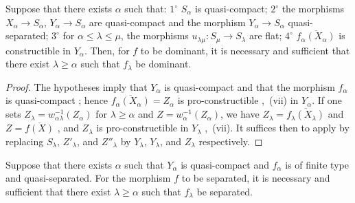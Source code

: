 \begin{proposition}[8.10.3]
\label{IV.8.10.3}
Suppose that there exists $\alpha$ such that: $1^\circ$ $S_\alpha$ is quasi-compact; $2^\circ$ the morphisms $X_\alpha\to S_\alpha$, $Y_\alpha\to S_\alpha$ are quasi-compact and the morphism $Y_\alpha\to S_\alpha$ quasi-separated; $3^\circ$ for $\alpha\leqslant\lambda\leqslant\mu$, the morphisms $u_{\lambda\mu}:S_\mu\to S_\lambda$ are flat; $4^\circ$ $\overline{f_\alpha(X_\alpha)}$ is constructible in $Y_\alpha$.
Then, for $f$ to be dominant, it is necessary and sufficient that there exist $\lambda\geqslant\alpha$ such that $f_\lambda$ be dominant.
\end{proposition}

\begin{proof}
The hypotheses imply that $Y_\alpha$ is quasi-compact and that the morphism $f_\alpha$ is quasi-compact ; hence $\overline{f_\alpha(X_\alpha)}=Z_\alpha$ is pro-constructible ,~(vii) in $Y_\alpha$.
If one sets $Z_\lambda=w_{\alpha\lambda}^{-1}(Z_\alpha)$ for $\lambda\geqslant\alpha$ and $Z=w_\alpha^{-1}(Z_\alpha)$, we have $Z_\lambda=\overline{f_\lambda(X_\lambda)}$ and $Z=\overline{f(X)}$ , and $Z_\lambda$ is pro-constructible in $Y_\lambda$ ,~(vii).
It suffices then to apply  by replacing $S_\lambda$, $Z'_\lambda$, and $Z''_\lambda$ by $Y_\lambda$, $Y_\lambda$, and $Z_\lambda$ respectively.
\end{proof}

\begin{proposition}[8.10.4]
\label{IV.8.10.4}
Suppose that there exists $\alpha$ such that $Y_\alpha$ is quasi-compact and $f_\alpha$ is of finite type and quasi-separated.
For the morphism $f$ to be separated, it is necessary and sufficient that there exist $\lambda\geqslant\alpha$ such that $f_\lambda$ be separated.
\end{proposition}

